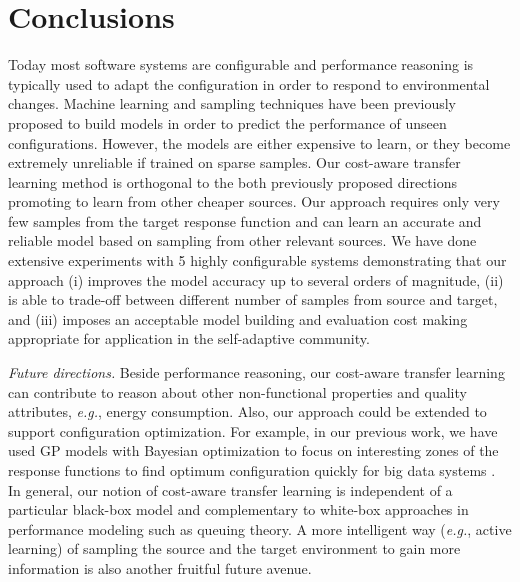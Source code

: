 \section{Conclusions}
\label{sec:conclusions}

Today most software systems are configurable and performance reasoning is typically used to adapt the configuration in order to respond to environmental changes. Machine learning and sampling techniques have been previously proposed to build models in order to predict the performance of unseen configurations. However, the models are either expensive to learn, or they become extremely unreliable if trained on sparse samples. Our cost-aware transfer learning method is orthogonal to the both previously proposed directions promoting to learn from other cheaper sources. Our approach requires only very few samples from the target response function and can learn an accurate and reliable model based on sampling from other relevant sources. We have done extensive experiments with 5 highly configurable systems demonstrating that our approach (i) improves the model accuracy up to several orders of magnitude, (ii) is able to trade-off between different number of samples from source and target, and (iii) imposes an acceptable model building and evaluation cost making appropriate for application in the self-adaptive community.  

{\noindent \em Future directions.}
Beside performance reasoning, our cost-aware transfer learning can contribute to reason about other non-functional properties and quality attributes, \emph{e.g.}, energy consumption. Also, our approach could be extended to support configuration optimization. For example, in our previous work, we have used GP models with Bayesian optimization to focus on interesting zones of the response functions to find optimum configuration quickly for big data systems \cite{jamshidi2016bo4co}. %
In general, our notion of cost-aware transfer learning is independent of a particular black-box model and complementary to white-box approaches in performance modeling such as queuing theory. A more intelligent way (\emph{e.g.}, active learning) of sampling the source and the target environment to gain more information is also another fruitful future avenue.